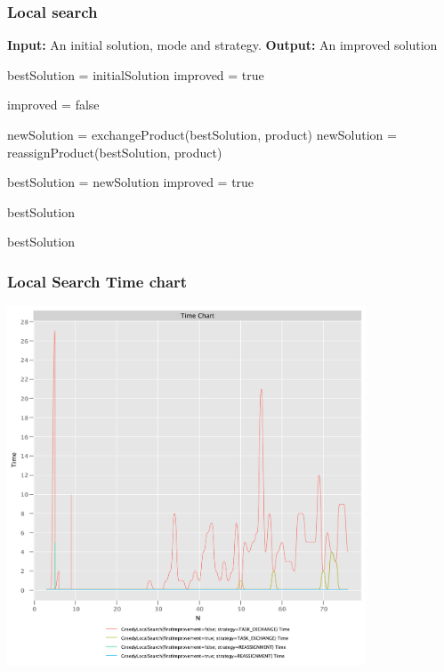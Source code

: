 \documentclass{beamer}
\begin{document}
\begin{frame}[fragile] 
\frametitle{Local search}
\begin{algorithm}
\begin{algorithmic}
   \State \textbf{Input:} An initial solution, mode and strategy.
    \State \textbf{Output:} An improved solution

    \State bestSolution = initialSolution
    \State improved = true
        
        \State improved = false

                \State newSolution = exchangeProduct(bestSolution, product)
                \State newSolution = reassignProduct(bestSolution, product)
            \EndIf

                \State bestSolution = newSolution
                \State improved = true
                
                    \State \Return bestSolution
                \EndIf
            \EndIf
        \EndFor
    \EndWhile

    \State \Return bestSolution
\end{algorithmic}
\end{algorithm}

\end{frame}


\begin{frame}
\frametitle{Local Search Time chart}
\includegraphics[width=0.8\textwidth]{./documentation/assets/new.localSearchParams.timeChart.pdf}
\end{frame}
\end{document}
